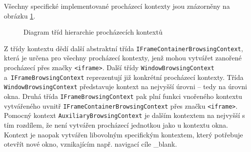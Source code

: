 \noindent Všechny specifické implementované procházecí kontexty jsou znázorněny na obrázku \ref{Figure.BrowsingContextsHierarchy}.

\begin{figure}[H]
  \begin{center}
    \caption{Diagram tříd hierarchie procházecích kontextů}
    \label{Figure.BrowsingContextsHierarchy}
  \end{center}
\end{figure}

Z třídy kontextu dědí další abstraktní třída \texttt{IFrameContainerBrowsingContext}, která je určena pro všechny procházecí kontexty, jenž mohou vytvářet zanořené procházecí přes značky \texttt{<iframe>}. Další třídy \texttt{WindowBrowsingContext} a~\texttt{IFrameBrowsingContext} reprezentují již konkrétní procházecí kontexty. Třída \texttt{WindowBrowsingContext} představuje kontext na nejvyšší úrovni -- tedy na úrovni okna. Druhá třída \texttt{IFrameBrowsingContext} pak plní funkci vnořeného kontextu vytvářeného uvnitř \texttt{IFrameContainerBrowsingContext} přes značku \texttt{<iframe>}. Pomocný kontext \texttt{AuxiliaryBrowsingContext} je dalším kontextem na nejvyšší s tím rozdílem, že není vytvářen procházecí jednotkou jako u kontextu okna. Kontext je naopak vytvářen libovolným specifickým kontextem, který potřebuje otevřít nové okno, vznikajícím např. navigací cíle \_blank.

